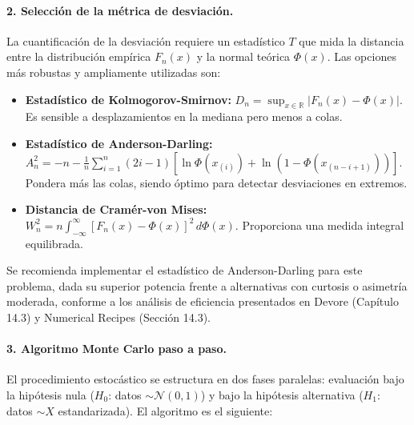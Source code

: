 \documentclass[12pt]{article}
\begin{document}
\paragraph{2. Selección de la métrica de desviación.}
La cuantificación de la desviación requiere un estadístico $T$ que mida la distancia entre la distribución empírica $F_n(x)$ y la normal teórica $\Phi(x)$. Las opciones más robustas y ampliamente utilizadas son:
\begin{itemize}
    \item \textbf{Estadístico de Kolmogorov-Smirnov:} $D_n = \sup_{x \in \mathbb{R}} |F_n(x) - \Phi(x)|$. Es sensible a desplazamientos en la mediana pero menos a colas.
    \item \textbf{Estadístico de Anderson-Darling:} $A_n^2 = -n - \frac{1}{n} \sum_{i=1}^n (2i-1)\left[\ln \Phi(x_{(i)}) + \ln(1 - \Phi(x_{(n-i+1)}))\right]$. Pondera más las colas, siendo óptimo para detectar desviaciones en extremos.
    \item \textbf{Distancia de Cramér-von Mises:} $W_n^2 = n \int_{-\infty}^\infty [F_n(x) - \Phi(x)]^2 \, d\Phi(x)$. Proporciona una medida integral equilibrada.
\end{itemize}
Se recomienda implementar el estadístico de Anderson-Darling para este problema, dada su superior potencia frente a alternativas con curtosis o asimetría moderada, conforme a los análisis de eficiencia presentados en Devore (Capítulo 14.3) y Numerical Recipes (Sección 14.3).

\paragraph{3. Algoritmo Monte Carlo paso a paso.}
El procedimiento estocástico se estructura en dos fases paralelas: evaluación bajo la hipótesis nula ($H_0$: datos $\sim \mathcal{N}(0,1)$) y bajo la hipótesis alternativa ($H_1$: datos $\sim X$ estandarizada). El algoritmo es el siguiente:
\end{document}
